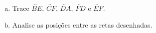 \documentclass[a4paper,14pt]{article}
\begin{document}
\begin{multicols}{2}
\begin{enumerate}
   			\begin{enumerate}[a)]
   				\item Trace $\overleftrightarrow{BE}$, $\overleftrightarrow{CF}$, $\overleftrightarrow{DA}$, $\overleftrightarrow{FD}$ e $\overleftrightarrow{EF}$.
   				\item Analise as posições entre as retas desenhadas.
   			\end{enumerate}
	    \end{enumerate} 
        $~$ \\ $~$ \\ $~$ \\ $~$ \\ $~$ \\ $~$ \\ $~$ \\ $~$ \\ $~$ \\ $~$ \\ $~$ \\ $~$ \\ $~$  \\ $~$ \\ $~$ \\ $~$ \\ $~$ \\ $~$ \\ $~$ \\ $~$ \\ $~$ \\ $~$ \\ $~$ \\ $~$ \\ $~$ \\ $~$ \\ $~$ \\ $~$ \\ $~$ \\ $~$ \\ $~$ \\ $~$ \\ $~$ \\ $~$ \\ $~$ \\ $~$ \\ $~$ \\ $~$ \\ $~$ \\ $~$ \\ $~$ \\ $~$ \\ $~$ \\ $~$ \\ $~$ \\ $~$ \\ $~$ \\ $~$ \\ $~$ \\ $~$ \\ $~$ \\ $~$ \\ $~$ \\ $~$ \\ $~$ \\ $~$ \\ $~$ \\ $~$ \\ $~$ \\ $~$ \\ $~$ \\ $~$
	\end{multicols}
\end{document}
